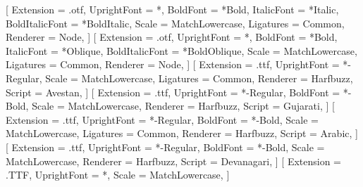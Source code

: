 %
[%
   Extension      = .otf,%
   UprightFont    = *,%
   BoldFont       = *Bold,%
   ItalicFont     = *Italic,%
   BoldItalicFont = *BoldItalic,%
   Scale          = MatchLowercase,%
   Ligatures      = {Common},%
   Renderer       = Node,%
]%
%
[%
   Extension      = .otf,%
   UprightFont    = *,%
   BoldFont       = *Bold,%
   ItalicFont     = *Oblique,%
   BoldItalicFont = *BoldOblique,%
   Scale          = MatchLowercase,%
   Ligatures      = {Common},%
   Renderer       = Node,%
]%
%
[%
   Extension      = .ttf,%
   UprightFont    = *-Regular,%
   Scale          = MatchLowercase,%
   Ligatures      = {Common},%
   Renderer       = Harfbuzz,%
   Script         = Avestan,%
]%
%
[%
   Extension      = .ttf,%
   UprightFont    = *-Regular,%
   BoldFont       = *-Bold,%
   Scale          = MatchLowercase,%
   Renderer       = Harfbuzz,%
   Script         = Gujarati,%
]%
%
[%
   Extension      = .ttf,%
   UprightFont    = *-Regular,%
   BoldFont       = *-Bold,%
   Scale          = MatchLowercase,%
   Ligatures      = {Common},%
   Renderer       = Harfbuzz,%
   Script         = Arabic,%
]%
%
[%
   Extension      = .ttf,%
   UprightFont    = *-Regular,%
   BoldFont       = *-Bold,%
   Scale          = MatchLowercase,%
   Renderer       = Harfbuzz,%
   Script         = Devanagari,%
]%
%
[%
   Extension      = .TTF,%
   UprightFont    = *,%
   Scale          = MatchLowercase,%
]%
\newcommand{\textarabic}[1]{\bgroup\microtypesetup{activate=false}\textdir TRT\arabicfont #1\egroup}
\newcommand{\textavestan}[1]{\bgroup\microtypesetup{activate=false}\textdir TRT\avestanfont #1\egroup}
\newcommand{\textgujarati}[1]{\bgroup\microtypesetup{activate=false}\gujaratifont #1\egroup}
\newcommand{\textpahlavi}[1]{\bgroup\microtypesetup{activate=false}\textdir TRT\pahlavifont #1\egroup}
\newcommand{\textsanskrit}[1]{\bgroup\microtypesetup{activate=false}\sanskritfont #1\egroup}

\newcommand*{\aee}{ǝ̄}
\newcommand*{\XVE}{x\textsuperscript{v}}
\newcommand*{\NGVE}{ŋ\textsuperscript{v}}

